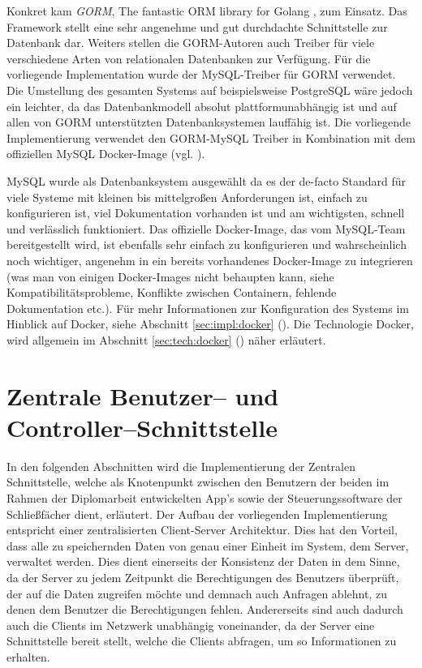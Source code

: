 \noindent
Konkret kam \textit{GORM}, \frqq{}The fantastic ORM library for Golang\flqq{} \cite{gorm},  zum Einsatz. Das Framework stellt eine sehr angenehme und gut durchdachte Schnittstelle zur Datenbank dar. Weiters stellen die GORM-Autoren auch Treiber für viele verschiedene Arten von relationalen Datenbanken zur Verfügung\cite{gorm:drivers}. Für die vorliegende Implementation wurde der MySQL-Treiber für GORM verwendet. Die Umstellung des gesamten Systems auf beispielsweise PostgreSQL wäre jedoch ein leichter, da das Datenbankmodell absolut plattformunabhängig ist und auf allen von GORM unterstützten Datenbanksystemen lauffähig ist. Die vorliegende Implementierung verwendet den GORM-MySQL Treiber in Kombination mit dem offiziellen MySQL Docker-Image (vgl. \cite{mysql:docker-image}). 

\noindent
MySQL wurde als Datenbanksystem ausgewählt da es der de-facto Standard für viele Systeme mit kleinen bis mittelgroßen Anforderungen ist, einfach zu konfigurieren ist, viel Dokumentation vorhanden ist und am wichtigsten, schnell und verlässlich funktioniert. Das offizielle Docker-Image, das vom MySQL-Team bereitgestellt wird, ist ebenfalls sehr einfach zu konfigurieren und wahrscheinlich noch wichtiger, angenehm in ein bereits vorhandenes Docker-Image zu integrieren (was man von einigen Docker-Images nicht behaupten kann, siehe Kompatibilitätsprobleme, Konflikte zwischen Containern, fehlende Dokumentation etc.). Für mehr Informationen zur Konfiguration des Systems im Hinblick auf Docker, siehe Abschnitt \ref{sec:impl:docker} (). Die Technologie \frqq{}Docker\flqq{}, wird allgemein im Abschnitt \ref{sec:tech:docker} () näher erläutert. 

\newpage
\section{Zentrale Benutzer-- und Controller--Schnittstelle}\label{sec:centralAPI}
In den folgenden Abschnitten wird die Implementierung der Zentralen Schnittstelle, welche als Knotenpunkt zwischen den Benutzern der beiden im Rahmen der Diplomarbeit entwickelten App's sowie der Steuerungssoftware der Schließfächer dient, erläutert. Der Aufbau der vorliegenden Implementierung entspricht einer zentralisierten Client-Server Architektur. Dies hat den Vorteil, dass alle zu speichernden Daten von genau einer Einheit im System, dem Server, verwaltet werden. Dies dient einerseits der Konsistenz der Daten in dem Sinne, da der Server zu jedem Zeitpunkt die Berechtigungen des Benutzers überprüft, der auf die Daten zugreifen möchte und demnach auch Anfragen ablehnt, zu denen dem Benutzer die Berechtigungen fehlen. Andererseits sind auch dadurch auch die Clients im Netzwerk unabhängig voneinander, da der Server eine Schnittstelle bereit stellt, welche die Clients abfragen, um so Informationen zu erhalten.\bigskip

